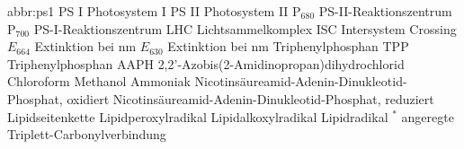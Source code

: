                 {abbr:ps1}
                {PS I}
                {Photosystem I}
                {PS II}
                {Photosystem II}
                {P$_{680}$}
                {PS-II-Reaktionszentrum}
                {P$_{700}$}
                {PS-I-Reaktionszentrum}
                {LHC}
                {Lichtsammelkomplex}
                {ISC}
                {Intersystem Crossing}
                {$E_{664}$}
                {Extinktion bei \unit[664]{nm}}
                {$E_{630}$}
                {Extinktion bei \unit[630]{nm}}
                {}
                {Triphenylphosphan}
                {TPP}
                {Triphenylphosphan}
                {AAPH}
                {2,2'-Azobis(2-Amidinopropan)dihydrochlorid}
                {}
                {Chloroform}
                {}
                {Methanol}
                {}
                {Ammoniak}
                {}
                {Nicotinsäureamid-Adenin-Dinukleotid-Phosphat, oxidiert}
                {}
                {Nicotinsäureamid-Adenin-Dinukleotid-Phosphat, reduziert}
                {}
                {Lipidseitenkette}
                {}
                {Lipidperoxylradikal}
                {}
                {Lipidalkoxylradikal}
                {}
                {Lipidradikal}
                {$^*$}
                {angeregte Triplett-Carbonylverbindung}
